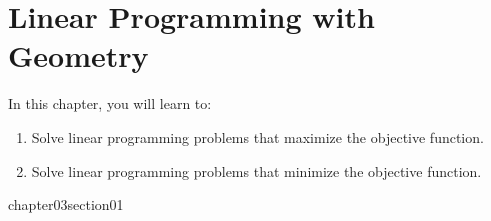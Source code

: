 \chapter{Linear Programming with Geometry}

In this chapter, you will learn to:

\begin{enumerate}
    \item Solve linear programming problems that maximize the objective function.
    \item Solve linear programming problems that minimize the objective function.
\end{enumerate}


{chapter03section01}
